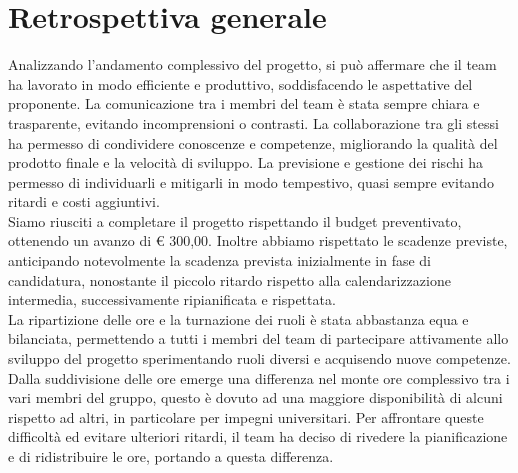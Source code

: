 \section{Retrospettiva generale}
Analizzando l'andamento complessivo del progetto, si può affermare che il team ha lavorato in modo efficiente e produttivo, soddisfacendo le aspettative del proponente. La comunicazione tra i membri del team è stata sempre chiara e trasparente, evitando incomprensioni o contrasti. La collaborazione tra gli stessi ha permesso di condividere conoscenze e competenze, migliorando la qualità del prodotto finale e la velocità di sviluppo. La previsione e gestione dei rischi ha permesso di individuarli e mitigarli in modo tempestivo, quasi sempre evitando ritardi e costi aggiuntivi. \\
Siamo riusciti a completare il progetto rispettando il budget preventivato, ottenendo un avanzo di € 300,00. Inoltre abbiamo rispettato le scadenze previste, anticipando notevolmente la scadenza prevista inizialmente in fase di candidatura, nonostante il piccolo ritardo rispetto alla calendarizzazione intermedia, successivamente ripianificata e rispettata. \\
La ripartizione delle ore e la turnazione dei ruoli è stata abbastanza equa e bilanciata, permettendo a tutti i membri del team di partecipare attivamente allo sviluppo del progetto sperimentando ruoli diversi e acquisendo nuove competenze. Dalla suddivisione delle ore emerge una differenza nel monte ore complessivo tra i vari membri del gruppo, questo è dovuto ad una maggiore disponibilità di alcuni rispetto ad altri, in particolare per impegni universitari. Per affrontare queste difficoltà ed evitare ulteriori ritardi, il team ha deciso di rivedere la pianificazione e di ridistribuire le ore, portando a questa differenza.

